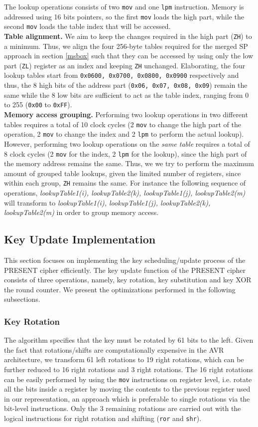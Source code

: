 \documentclass[11pt]{llncs2e} %
\begin{document}
The lookup operations consists of two \texttt{mov} and one \texttt{lpm} instruction. Memory is addressed using 16 bits pointers, so the first \texttt{mov} loads the high part, while the second \texttt{mov} loads the table index that will be accessed.\\
\textbf{Table alignment.} We aim to keep the changes required in the high part (\texttt{ZH}) to a minimum. Thus, we align the four 256-byte tables required for the merged SP approach in section \ref{msbox} such that they can be accessed by using only the  low part (\texttt{ZL}) register as an index and keeping \texttt{ZH} unchanged. Elaborating, the four lookup tables start from \texttt{0x0600, 0x0700, 0x0800, 0x0900} respectively and thus, the 8 high bits of the address part (\texttt{0x06, 0x07, 0x08, 0x09}) remain the same while the 8 low bits are sufficient to act as the table index, ranging from 0 to 255 (\texttt{0x00} to \texttt{0xFF}). \\
\textbf{Memory access grouping.} Performing two lookup operations in two different tables requires a total of 10 clock cycles (2 \texttt{mov} to change the high part of the operation, 2 \texttt{mov} to change the index and 2 \texttt{lpm} to perform the actual lookup). However, performing two lookup operations on the \emph{same table} requires a total of 8 clock cycles (2 \texttt{mov} for the index, 2 \texttt{lpm} for the lookup), since the high part of the memory address remains the same. Thus, we 
we try to perform the maximum amount of grouped table lookups, given the limited number of registers, since within each group, \texttt{ZH} remains the same. For instance the following sequence of operations, \emph{ lookupTable1(i), lookupTable2(k), lookupTable1(j), lookupTable2(m)} will transform to \emph{ lookupTable1(i), lookupTable1(j), lookupTable2(k), lookupTable2(m)} in order to group memory access.
\subsection{Key Update Implementation}
This section focuses on implementing the key scheduling/update process of the PRESENT cipher efficiently. The key update function of the PRESENT cipher consists of three operations, namely, key rotation, key substitution and key XOR the round counter. We present the optimizations performed in the following subsections.
\subsubsection{Key Rotation}
The algorithm specifies that the key must be rotated by 61 bits to the left. Given the fact that rotations/shifts are computationally expensive in the AVR architecture, we transform 61 left rotations to 19 right rotations, which can be further reduced to 16 right rotations and 3 right rotations. The 16 right rotations can be easily performed by using the \texttt{mov} instructions on register level, i.e. rotate all the bits inside a register by moving the contents to the previous register used in our representation, an approach which is preferable to single rotations via the bit-level instructions. Only the 3 remaining rotations are carried out with the logical instructions for right rotation and shifting (\texttt{ror} and \texttt{shr}).
\end{document}
